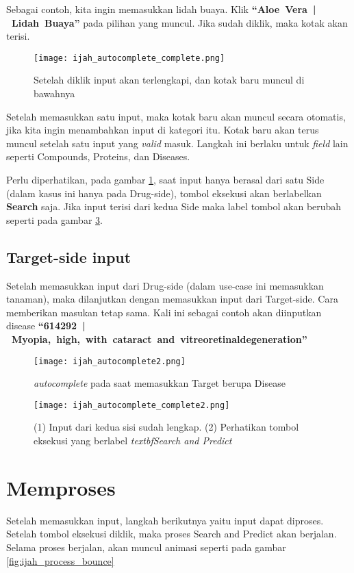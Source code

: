 	Sebagai contoh, kita ingin memasukkan lidah buaya. Klik \mbox{\textbf{``Aloe Vera | Lidah Buaya''}} pada pilihan yang muncul. Jika sudah diklik, maka kotak akan terisi.

	\begin{figure}[H]
		\centering
		\texttt{[image: ijah\_autocomplete\_complete.png]}
		\caption{Setelah diklik input akan terlengkapi, dan kotak baru muncul di bawahnya}
		\label{fig:ijah_autocomplete_complete}
		\end{figure}

	Setelah memasukkan satu input, maka kotak baru akan muncul secara otomatis, jika kita ingin menambahkan input di kategori itu. Kotak baru akan terus muncul setelah satu input yang \emph{valid} masuk. Langkah ini berlaku untuk \emph{field} lain seperti Compounds, Proteins, dan Diseases.

	Perlu diperhatikan, pada gambar \ref{fig:ijah_autocomplete_complete}, saat input hanya berasal dari satu Side (dalam kasus ini hanya pada Drug-side), tombol eksekusi akan berlabelkan \textbf{Search} saja. Jika input terisi dari kedua Side maka label tombol akan berubah seperti pada gambar \ref{fig:ijah_autocomplete_complete2}.

	\subsection{Target-side input}
	Setelah memasukkan input dari Drug-side (dalam use-case ini memasukkan tanaman), maka dilanjutkan dengan memasukkan input dari Target-side. Cara memberikan masukan tetap sama. Kali ini sebagai contoh akan diinputkan disease \mbox{\textbf{``614292 | Myopia, high, with cataract and vitreoretinaldegeneration''}}

	\begin{figure}[H]
		\centering
		\texttt{[image: ijah\_autocomplete2.png]}
		\caption{\emph{autocomplete} pada saat memasukkan Target berupa Disease}
		\label{fig:ijah_autocomplete_click2}
		\end{figure}

	\begin{figure}[H]
		\centering
		\texttt{[image: ijah\_autocomplete\_complete2.png]}
		\caption{(1) Input dari kedua sisi sudah lengkap. (2) Perhatikan tombol eksekusi yang berlabel \emph{textbf{Search and Predict}}}
		\label{fig:ijah_autocomplete_complete2}
		\end{figure}


\section{Memproses} \label{process}
Setelah memasukkan input, langkah berikutnya yaitu input dapat diproses. Setelah tombol eksekusi diklik, maka proses Search and Predict akan berjalan. Selama proses berjalan, akan muncul animasi seperti pada gambar \ref{fig:ijah_process_bounce}

